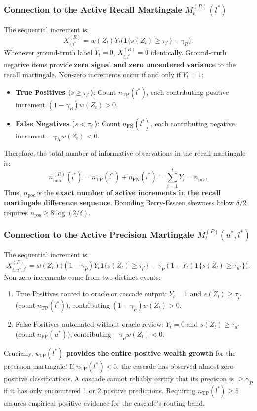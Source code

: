 \documentclass[11pt,a4paper]{article}
\begin{document}
\subsubsection{Connection to the Active Recall Martingale $M_t^{(R)}(l^*)$}
The sequential increment is:
\begin{equation}
X_{t, l^*}^{(R)} = w(Z_t) Y_t \big( \mathbf{1}\{s(Z_t) \ge \tau_{l^*}\} - \gamma_R \big).
\end{equation}
Whenever ground-truth label $Y_t = 0$, $X_{t, l^*}^{(R)} = 0$ identically. Ground-truth negative items provide \textbf{zero signal and zero uncentered variance} to the recall martingale. Non-zero increments occur if and only if $Y_t = 1$:
\begin{itemize}
    \item \textbf{True Positives ($s \ge \tau_{l^*}$)}: Count $n_{\text{TP}}(l^*)$, each contributing positive increment $(1 - \gamma_R) w(Z_t) > 0$.
    \item \textbf{False Negatives ($s < \tau_{l^*}$)}: Count $n_{\text{FN}}(l^*)$, each contributing negative increment $-\gamma_R w(Z_t) < 0$.
\end{itemize}
Therefore, the total number of informative observations in the recall martingale is:
\begin{equation}
n_{\text{info}}^{(R)}(l^*) = n_{\text{TP}}(l^*) + n_{\text{FN}}(l^*) = \sum_{i=1}^t Y_i = n_{\text{pos}}.
\end{equation}
Thus, $n_{\text{pos}}$ is the \textbf{exact number of active increments in the recall martingale difference sequence}. Bounding Berry-Esseen skewness below $\delta/2$ requires $n_{\text{pos}} \ge 8 \log(2/\delta)$.

\subsubsection{Connection to the Active Precision Martingale $M_t^{(P)}(u^*, l^*)$}
The sequential increment is:
\begin{equation}
X_{t, u^*, l^*}^{(P)} = w(Z_t) \Big( (1 - \gamma_P) Y_t \mathbf{1}\{s(Z_t) \ge \tau_{l^*}\} - \gamma_P (1 - Y_t) \mathbf{1}\{s(Z_t) \ge \tau_{u^*}\} \Big).
\end{equation}
Non-zero increments come from two distinct events:
\begin{enumerate}
    \item True Positives routed to oracle or cascade output: $Y_t = 1$ and $s(Z_t) \ge \tau_{l^*}$ (count $n_{\text{TP}}(l^*)$), contributing $(1 - \gamma_P) w(Z_t) > 0$.
    \item False Positives automated without oracle review: $Y_t = 0$ and $s(Z_t) \ge \tau_{u^*}$ (count $n_{\text{FP}}(u^*)$), contributing $-\gamma_P w(Z_t) < 0$.
\end{enumerate}
Crucially, \textbf{$n_{\text{TP}}(l^*)$ provides the entire positive wealth growth} for the precision martingale! If $n_{\text{TP}}(l^*) < 5$, the cascade has observed almost zero positive classifications. A cascade cannot reliably certify that its precision is $\ge \gamma_P$ if it has only encountered 1 or 2 positive predictions. Requiring $n_{\text{TP}}(l^*) \ge 5$ ensures empirical positive evidence for the cascade's routing band.
\end{document}
